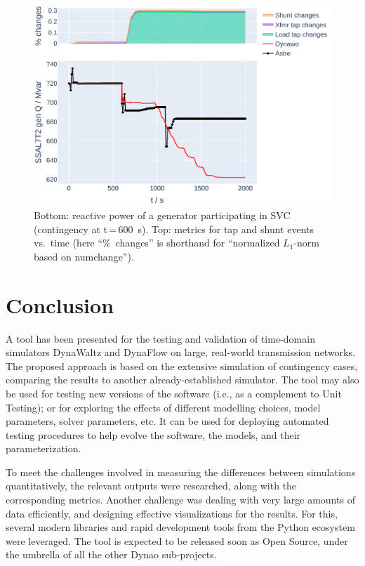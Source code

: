\documentclass[conference]{IEEEtran}
\newcommand{\Dynawo}{Dyna\textomega o} %
\begin{document}
\begin{figure}
  \centering
  \includegraphics[width=\columnwidth]{figs/Qgen_curve_GENS_20210211-0930_moreT600}
  \caption{Bottom: reactive power of a generator participating in SVC
    (contingency at t\,=\,\SI{600}{s}). Top: metrics for tap and shunt
    events vs.\ time (here ``\%~changes'' is shorthand for ``normalized
    $L_1$-norm based on numchange'').}
  \label{fig:curveplot}
\end{figure}




\section{Conclusion}

A tool has been presented for the testing and validation of time-domain
simulators DynaWaltz and DynaFlow on large, real-world transmission networks.
The proposed approach is based on the extensive simulation of contingency cases,
comparing the results to another already-established simulator. The tool may
also be used for testing new versions of the software (i.e., as a complement to
Unit Testing); or for exploring the effects of different modelling choices,
model parameters, solver parameters, etc.  It can be used for deploying
automated testing procedures to help evolve the software, the models, and their
parameterization.

To meet the challenges involved in measuring the differences between simulations
quantitatively, the relevant outputs were researched, along with the
corresponding metrics. Another challenge was dealing with very large amounts of
data efficiently, and designing effective visualizations for the results. For
this, several modern libraries and rapid development tools from the Python
ecosystem were leveraged.  The tool is expected to be released soon as Open
Source, under the umbrella of all the other \Dynawo{} sub-projects.






\end{document}
